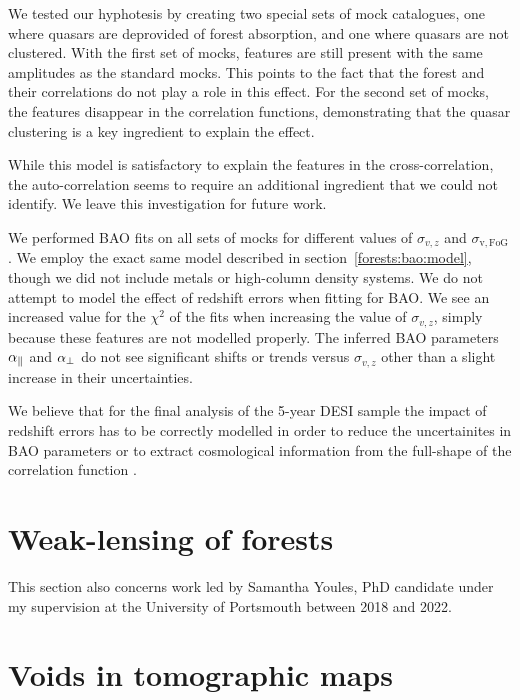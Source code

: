 We tested our hyphotesis by creating two special sets of mock catalogues, one 
where quasars are deprovided of forest absorption, and one where quasars are 
not clustered. With the first set of mocks, features are still present with the 
same amplitudes as the standard mocks. 
This points to the fact that the \lya forest and their correlations do not play 
a role in this effect. 
For the second set of mocks, the features disappear in the correlation functions, 
demonstrating that the quasar clustering is a key ingredient to explain the effect. 

While this model is satisfactory to explain the features in the cross-correlation, 
the auto-correlation seems to require an additional ingredient that we could not 
identify. We leave this investigation for future work. 

We performed BAO fits on all sets of mocks for different values of 
$\sigma_{v, z}$ and $\sigma_\mathrm{v, FoG}$. We employ the exact same model 
described in section~\ref{forests:bao:model}, though we did not include 
metals or high-column density systems. We do not attempt to model 
the effect of redshift errors when fitting for BAO. 
We see an increased value for the $\chi^2$ of the fits when increasing 
the value of $\sigma_{v, z}$, simply because these features are not modelled
properly. The inferred BAO parameters ${\alpha_\parallel}$ and ${\alpha_\perp}$ do not see 
significant shifts or trends versus $\sigma_{v, z}$ other than a slight increase 
in their uncertainties. 

We believe that for the final analysis of the 5-year DESI sample the impact 
of redshift errors has to be correctly modelled in order to reduce the 
uncertainites in BAO parameters or to extract cosmological information from  
the full-shape of the correlation function \cite{cuceuCosmologyBAO3D2021}.

\section{Weak-lensing of forests}
\label{forests:lensing}

This section also concerns work led by Samantha Youles, PhD candidate under 
my supervision at the University of Portsmouth between 2018 and 2022. 

\section{Voids in tomographic maps}
\label{forests:voids}

\cite{ravouxFirstMeasurementCorrelation2022}


